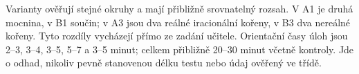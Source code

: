 \documentclass[a4paper,10pt]{article}
\begin{document}
Varianty ověřují stejné okruhy a mají přibližně srovnatelný rozsah.
V A1 je druhá mocnina, v B1 součin; v A3 jsou dva reálné iracionální kořeny,
v B3 dva nereálné kořeny. Tyto rozdíly vycházejí přímo ze zadání učitele.
Orientační časy úloh jsou 2--3, 3--4, 3--5, 5--7 a 3--5 minut;
celkem přibližně 20--30 minut včetně kontroly. Jde o odhad, nikoliv pevně
stanovenou délku testu nebo údaj ověřený ve třídě.
\end{document}
